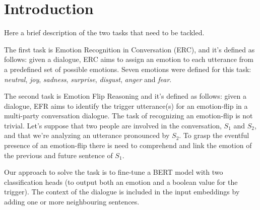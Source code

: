 \documentclass[11pt]{article}
\begin{document}


\section{Introduction}
\label{sec:introduction}
Here a brief description of the two tasks that need to be tackled. 

The first task is Emotion Recognition in Conversation (ERC), and it's defined as follows: given a dialogue, ERC aims to assign an emotion to each utterance from a predefined set of possible emotions. Seven emotions were defined for this task: \textit{neutral}, \textit{joy}, \textit{sadness}, \textit{surprise}, \textit{disgust}, \textit{anger} and \textit{fear}.

The second task is Emotion Flip Reasoning and it's defined as follows: given a dialogue, EFR aims to identify the trigger utterance(s) for an emotion-flip in a multi-party conversation dialogue.
The task of recognizing an emotion-flip is not trivial. Let's suppose that two people are involved in the conversation, $S_1$ and $S_2$, and that we're analyzing an utterance pronounced by $S_2$. To grasp the eventful presence of an emotion-flip there is need to comprehend and link the emotion of the previous and future sentence of $S_1$.

Our approach to solve the task is to fine-tune a BERT model with two classification heads (to output both an emotion and a boolean value for the trigger). The context of the dialogue is included in the input embeddings by adding one or more neighbouring sentences.
\end{document}
